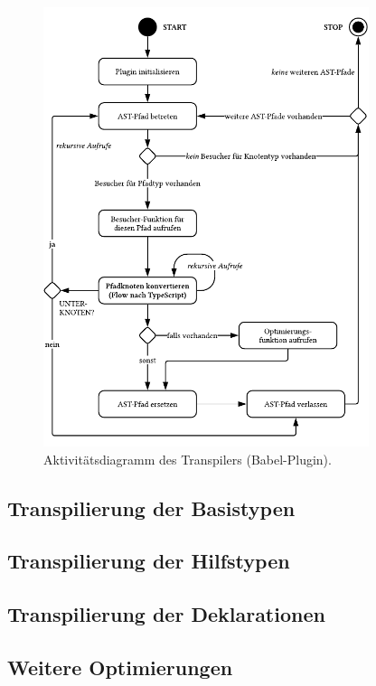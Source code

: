   \begin{figure}[tbp]
    \centering
    \includegraphics[width=0.85\textwidth]{src/4_Umsetzung/img/activity-diagram-plugin.pdf}
    \captionsetup{justification=centering}
    \caption{Aktivitätsdiagramm des Transpilers (Babel-Plugin).}
    \label{fig:activity-diagram-plugin}
  \end{figure}

  \subsection{Transpilierung der Basistypen}
  \subsection{Transpilierung der Hilfstypen}
  \subsection{Transpilierung der Deklarationen}

  \subsection{Weitere Optimierungen}
